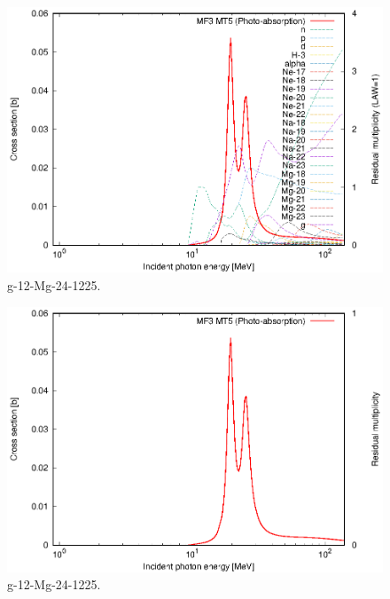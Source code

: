 \begin{figure}
 \includegraphics[width=\linewidth]{eps/g_12-Mg-24_1225.eps}
  \caption{g-12-Mg-24-1225.}
\end{figure}
\begin{figure}
 \includegraphics[width=\linewidth]{eps-law0/g_12-Mg-24_1225.eps}
 \caption{g-12-Mg-24-1225.}
\end{figure}
\newpage \clearpage


